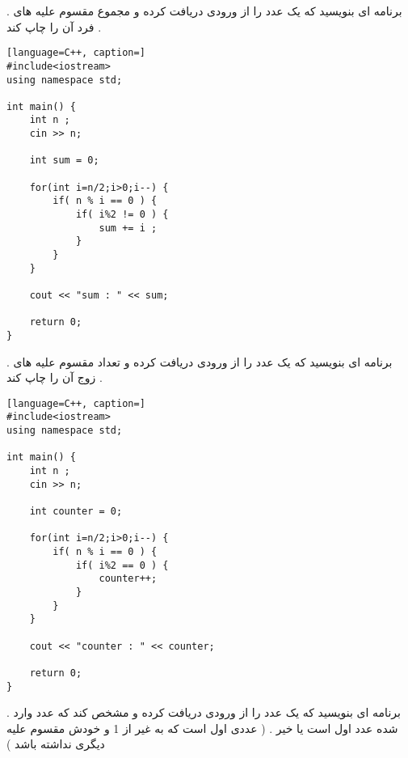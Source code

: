 \documentclass[12pt]{article}
\begin{document}
\newpage


 . برنامه ای بنویسید که یک عدد را از ورودی دریافت کرده و مجموع مقسوم علیه های فرد آن را چاپ کند .






\begin{latin}
\begin{lstlisting}[language=C++, caption=]
#include<iostream>
using namespace std;

int main() {
	int n ;
	cin >> n;
	
	int sum = 0;
	
	for(int i=n/2;i>0;i--) {
		if( n % i == 0 ) {
			if( i%2 != 0 ) {
				sum += i ;
			}
		}
	}

	cout << "sum : " << sum;
	
	return 0;
}
\end{lstlisting}
\end{latin}





\newpage


 . برنامه ای بنویسید که یک عدد را از ورودی دریافت کرده و تعداد مقسوم علیه های زوج آن را چاپ کند .







\begin{latin}
\begin{lstlisting}[language=C++, caption=]
#include<iostream>
using namespace std;

int main() {
	int n ;
	cin >> n;
	
	int counter = 0;
	
	for(int i=n/2;i>0;i--) {
		if( n % i == 0 ) {
			if( i%2 == 0 ) {
				counter++;
			}
		}
	}

	cout << "counter : " << counter;
	
	return 0;
}
\end{lstlisting}
\end{latin}








\newpage

 . برنامه ای بنویسید که یک عدد را از ورودی دریافت کرده و مشخص کند که عدد وارد شده عدد اول است یا خیر . ( عددی اول است که به غیر از 1 و خودش مقسوم علیه دیگری نداشته باشد ) 
\end{document}
